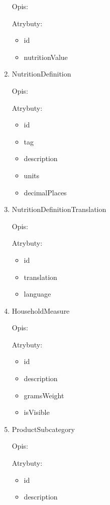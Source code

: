\begin{enumerate}[label={\textbf{KAT/\protect\threedigits{\theenumi}}}, wide, labelwidth=!, labelindent=0pt]
    Opis: \lipsum[1]
    \par
    Atrybuty:
    \begin{itemize}
        \item id
        \item nutritionValue
    \end{itemize}

    \item \label{kat:NutritionDefinition} NutritionDefinition

    Opis: \lipsum[1]
    \par
    Atrybuty:
    \begin{itemize}
        \item id
        \item tag
        \item description
        \item units
        \item decimalPlaces
    \end{itemize}

    \item \label{kat:NutritionDefinitionTranslation} NutritionDefinitionTranslation

    Opis: \lipsum[1]
    \par
    Atrybuty:
    \begin{itemize}
        \item id
        \item translation
        \item language
    \end{itemize}

    \item \label{kat:HouseholdMeasure} HouseholdMeasure

    Opis: \lipsum[1]
    \par
    Atrybuty:
    \begin{itemize}
        \item id
        \item description
        \item gramsWeight
        \item isVisible
    \end{itemize}

    \item \label{kat:ProductSubcategory} ProductSubcategory

    Opis: \lipsum[1]
    \par
    Atrybuty:
    \begin{itemize}
        \item id
        \item description
    \end{itemize}


\end{enumerate}
